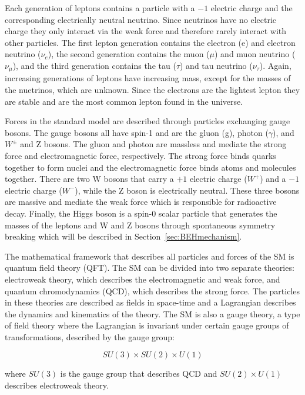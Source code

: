 Each generation of leptons contains a particle with a $-1$ electric charge and the corresponding electrically neutral neutrino. Since neutrinos have no electric charge they only interact via the weak force and therefore rarely interact with other particles. The first lepton generation contains the electron (e) and electron neutrino ($\nu_{e}$), the second generation contains the muon ($\mu$) and muon neutrino ($\nu_{\mu}$), and the third generation contains the tau ($\tau$) and tau neutrino ($\nu_{\tau}$). Again, increasing generations of leptons have increasing mass, except for the masses of the nuetrinos, which are unknown. Since the electrons are the lightest lepton they are stable and are the most common lepton found in the universe. 

Forces in the standard model are described through particles exchanging gauge bosons. The gauge bosons all have spin-1 and are the gluon (g), photon ($\gamma$), and $W^{\pm}$ and Z bosons. The gluon and photon are massless and mediate the strong force and electromagnetic force, respectively. The strong force binds quarks together to form nuclei and the electromagnetic force binds atoms and molecules together. There are two W bosons that carry a $+1$ electric charge ($W^{+}$) and a $-1$ electric charge ($W^{-}$), while the Z boson is electrically neutral. These three bosons are massive and mediate the weak force which is responsible for radioactive decay. Finally, the Higgs boson is a spin-0 scalar particle that generates the masses of the leptons and W and Z bosons through spontaneous symmetry breaking which will be described in Section~\ref{sec:BEHmechanism}.

The mathematical framework that describes all particles and forces of the SM is quantum field theory (QFT). The SM can be divided into two separate theories: electroweak theory, which describes the electromagnetic and weak force, and quantum chromodynamics (QCD), which describes the strong force. The particles in these theories are described as fields in space-time and a Lagrangian describes the dynamics and kinematics of the theory. The SM is also a gauge theory, a type of field theory where the Lagrangian is invariant under certain gauge groups of transformations, described by the gauge group: 

\begin{equation}
SU(3)\times SU(2)\times U(1)
\end{equation}

\noindent
where $SU(3)$ is the gauge group that describes QCD and $SU(2)\times U(1)$ describes electroweak theory. 

